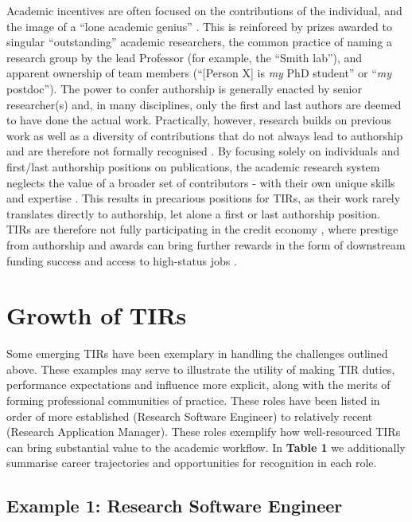 \documentclass[authordate,meta]{jote-new-article}
\begin{document}
Academic incentives are often focused on the contributions of the individual, and the image of a “lone academic genius” \parencites{Elkins-tanton2021}. This is reinforced by prizes awarded to singular “outstanding” academic researchers, the common practice of naming a research group by the lead Professor (for example, the “Smith lab”), and apparent ownership of team members (“[Person X] is \emph{my} PhD student” or “\emph{my} postdoc”). The power to confer authorship is generally enacted by senior researcher(s) and, in many disciplines, only the first and last authors are deemed to have done the actual work. Practically, however, research builds on previous work as well as a diversity of contributions that do not always lead to authorship and are therefore not formally recognised \parencites{Coles2022}{Forscher2020}{Shirazi2014}{Tiokhin2021}. By focusing solely on individuals and first/last authorship positions on publications, the academic research system neglects the value of a broader set of contributors - with their own unique skills and expertise \parencites{Baum2022}. This results in precarious positions for TIRs, as their work rarely translates directly to authorship, let alone a first or last authorship position. TIRs are therefore not fully participating in the credit economy \parencites{Zollman2018}, where prestige from authorship and awards can bring further rewards in the form of downstream funding success and access to high-status jobs \parencites{Huebner2020}.



\section{Growth of TIRs}



Some emerging TIRs have been exemplary in handling the challenges outlined above. These examples may serve to illustrate the utility of making TIR duties, performance expectations and influence more explicit, along with the merits of forming professional communities of practice. These roles have been listed in order of more established (Research Software Engineer) to relatively recent (Research Application Manager). These roles exemplify how well-resourced TIRs can bring substantial value to the academic workflow. In \textbf{Table 1} we additionally summarise career trajectories and opportunities for recognition in each role.



\subsection{Example 1: Research Software Engineer}
\end{document}
